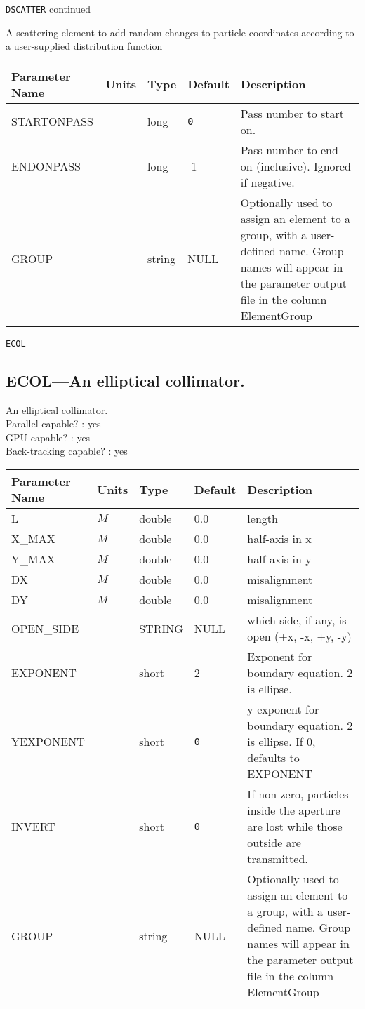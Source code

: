 \newpage
\begin{center}{\Large\verb|DSCATTER| continued}\end{center}
A scattering element to add random changes to particle coordinates according to a user-supplied distribution function
\\
\begin{tabular}{|l|l|l|l|p{\descwidth}|} \hline
Parameter Name & Units & Type & Default & Description \\ \hline 
STARTONPASS &  & long &  \verb|0| & Pass number to start on.  \\ \hline 
ENDONPASS &  & long &   -1              & Pass number to end on (inclusive).  Ignored if negative.  \\ \hline 
GROUP &  & string & NULL & Optionally used to assign an element to a group, with a user-defined name.  Group names will appear in the parameter output file in the column ElementGroup  \\ \hline 
\end{tabular}

\newpage
\begin{center}{\Large\verb|ECOL|}\end{center}
\subsection{ECOL---An elliptical collimator.}
An elliptical collimator.
\\
Parallel capable? : yes\\
GPU capable? : yes\\
Back-tracking capable? : yes\\
\begin{tabular}{|l|l|l|l|p{\descwidth}|} \hline
Parameter Name & Units & Type & Default & Description \\ \hline 
L & $M$ & double &  0.0 & length  \\ \hline 
X\_MAX & $M$ & double &  0.0 & half-axis in x  \\ \hline 
Y\_MAX & $M$ & double &  0.0 & half-axis in y  \\ \hline 
DX & $M$ & double &  0.0 & misalignment  \\ \hline 
DY & $M$ & double &  0.0 & misalignment  \\ \hline 
OPEN\_SIDE &  & STRING &   NULL            & which side, if any, is open (+x, -x, +y, -y)  \\ \hline 
EXPONENT &  & short &   2               & Exponent for boundary equation.  2 is ellipse.  \\ \hline 
YEXPONENT &  & short &  \verb|0| & y exponent for boundary equation.  2 is ellipse.  If 0, defaults to EXPONENT  \\ \hline 
INVERT &  & short &  \verb|0| & If non-zero, particles inside the aperture are lost while those outside are transmitted.  \\ \hline 
GROUP &  & string & NULL & Optionally used to assign an element to a group, with a user-defined name.  Group names will appear in the parameter output file in the column ElementGroup  \\ \hline 
\end{tabular}

